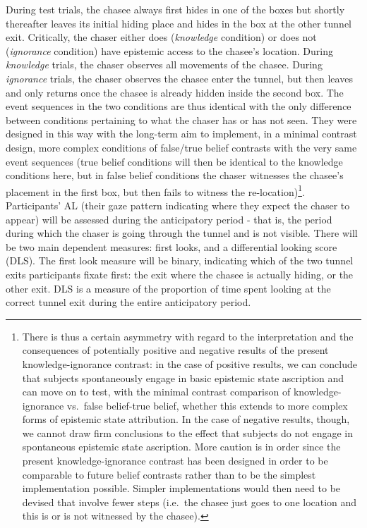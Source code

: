 \documentclass[
  man,floatsintext]{apa6}
\begin{document}
During test trials, the chasee always first hides in one of the boxes but shortly thereafter leaves its initial hiding place and hides in the box at the other tunnel exit. Critically, the chaser either does (\emph{knowledge} condition) or does not (\emph{ignorance} condition) have epistemic access to the chasee's location. During \emph{knowledge} trials, the chaser observes all movements of the chasee. During \emph{ignorance} trials, the chaser observes the chasee enter the tunnel, but then leaves and only returns once the chasee is already hidden inside the second box. The event sequences in the two conditions are thus identical with the only difference between conditions pertaining to what the chaser has or has not seen. They were designed in this way with the long-term aim to implement, in a minimal contrast design, more complex conditions of false/true belief contrasts with the very same event sequences (true belief conditions will then be identical to the knowledge conditions here, but in false belief conditions the chaser witnesses the chasee's placement in the first box, but then fails to witness the re-location)\footnote{There is thus a certain asymmetry with regard to the interpretation and the consequences of potentially positive and negative results of the present knowledge-ignorance contrast: in the case of positive results, we can conclude that subjects spontaneously engage in basic epistemic state ascription and can move on to test, with the minimal contrast comparison of knowledge-ignorance vs.~false belief-true belief, whether this extends to more complex forms of epistemic state attribution. In the case of negative results, though, we cannot draw firm conclusions to the effect that subjects do not engage in spontaneous epistemic state ascription. More caution is in order since the present knowledge-ignorance contrast has been designed in order to be comparable to future belief contrasts rather than to be the simplest implementation possible. Simpler implementations would then need to be devised that involve fewer steps (i.e.~the chasee just goes to one location and this is or is not witnessed by the chasee).}.
Participants' AL (their gaze pattern indicating where they expect the chaser to appear) will be assessed during the anticipatory period - that is, the period during which the chaser is going through the tunnel and is not visible. There will be two main dependent measures: first looks, and a differential looking score (DLS). The first look measure will be binary, indicating which of the two tunnel exits participants fixate first: the exit where the chasee is actually hiding, or the other exit. DLS is a measure of the proportion of time spent looking at the correct tunnel exit during the entire anticipatory period.
\end{document}
